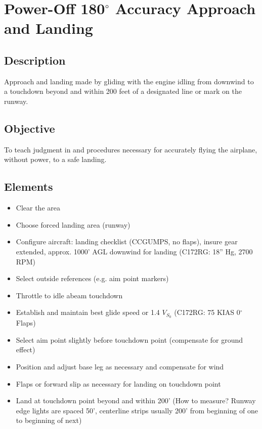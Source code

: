 \section{Power-Off 180$^\circ$ Accuracy Approach and Landing}

\subsection{Description}

Approach and landing made by gliding with the engine idling from downwind to a
touchdown beyond and within 200 feet of a designated line or mark on the
runway.

\subsection{Objective}

To teach judgment in and procedures necessary for accurately flying the
airplane, without power, to a safe landing.

\subsection{Elements}

\begin{itemize}
  \item Clear the area
  \item Choose forced landing area (runway)
  \item Configure aircraft: landing checklist (CCGUMPS, no flaps), insure gear
    extended, approx. 1000' AGL downwind for landing (C172RG: 18'' Hg, 2700 RPM)
  \item Select outside references (e.g. aim point markers)
  \item Throttle to idle abeam touchdown
  \item Establish and maintain best glide speed or 1.4 $V_{S_0}$ (C172RG: 75
    KIAS 0$^\circ$ Flaps)
  \item Select aim point slightly before touchdown point (compensate for ground
    effect)
  \item Position and adjust base leg as necessary and compensate for wind
  \item Flaps or forward slip as necessary for landing on touchdown point
  \item Land at touchdown point beyond and within 200' (How to measure? Runway
    edge lights are spaced 50', centerline strips usually 200' from beginning
    of one to beginning of next)
\end{itemize}

